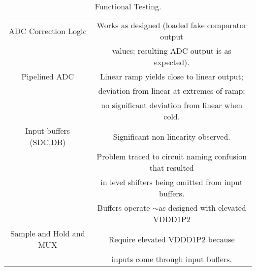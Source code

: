 \begin{table}[h]
\begin{tabular}{|c|c|}
 ADC Correction Logic & Works as designed (loaded fake comparator output \\ 
  & values; resulting ADC output is as expected). \\ \hline
Pipelined ADC & Linear ramp yields close to linear output; \\ 
 & deviation from linear at extremes of ramp; \\ 
  & no significant deviation from linear when cold. \\ \hline
Input buffers (SDC,DB) & Significant non-linearity observed. \\ 
 & Problem traced to circuit naming confusion that resulted \\ 
 & in level shifters being omitted from input buffers. \\
 & Buffers operate $\sim$as designed with elevated VDDD1P2 \\ \hline
 Sample and Hold and MUX & Require elevated VDDD1P2 because \\ 
 & inputs come through input buffers. \\ \hline
\end{tabular}
\caption{Functional Testing.}
\label{tab:Functionality}
\end{table}
